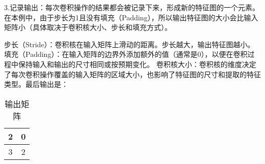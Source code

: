 3.记录输出：每次卷积操作的结果都会被记录下来，形成新的特征图的一个元素。在本例中，由于步长为1且没有填充（Padding），所以输出特征图的大小会比输入矩阵小（具体取决于卷积核大小、步长和填充方式）。

步长（Stride）：卷积核在输入矩阵上滑动的距离。步长越大，输出特征图越小。
填充（Padding）：在输入矩阵的边界外添加额外的值（通常是0），以便在卷积过程中保持输入和输出的尺寸相同或按预期变化。
卷积核大小：卷积核的维度决定了每次卷积操作覆盖的输入矩阵的区域大小，也影响了特征图的尺寸和提取的特征类型。
​
最后输出是：\begin{table}[ht]
\centering
\caption{输出矩阵}\label{tab_CNN24}
\begin{tabular}{|c|c|}
\hline
2 & 0 \\
\hline
3 & 2 \\
\hline
\end{tabular}
\end{table}
